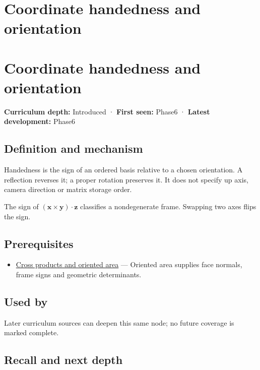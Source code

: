 \hypertarget{appendix-87d7626c8d37}{}
\section*{Coordinate handedness and orientation}
\section{Coordinate handedness and orientation}\label{appendix-87d7626c8d37-coordinate-handedness-and-orientation}

\textbf{Curriculum depth:} Introduced · \textbf{First seen:} Phase6 · \textbf{Latest development:} Phase6

\subsection{Definition and mechanism}\label{appendix-87d7626c8d37-definition-and-mechanism}

Handedness is the sign of an ordered basis relative to a chosen orientation. A reflection reverses it; a proper rotation preserves it. It does not specify up axis, camera direction or matrix storage order.

The sign of \((\mathbf x\times\mathbf y)\cdot\mathbf z\) classifies a nondegenerate frame. Swapping two axes flips the sign.

\subsection{Prerequisites}\label{appendix-87d7626c8d37-prerequisites}

\begin{itemize}
\tightlist
\item
  \hyperref[appendix-2391db8052b1]{Cross products and oriented area} --- Oriented area supplies face normals, frame signs and geometric determinants.
\end{itemize}

\subsection{Used by}\label{appendix-87d7626c8d37-used-by}

Later curriculum sources can deepen this same node; no future coverage is marked complete.

\subsection{Recall and next depth}\label{appendix-87d7626c8d37-recall-and-next-depth}

